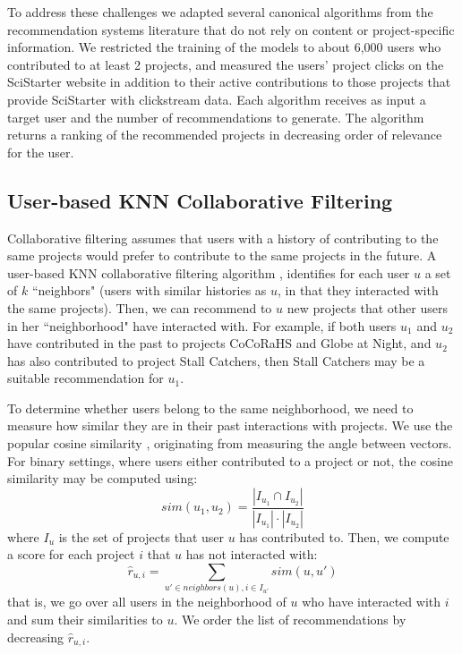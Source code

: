 \documentclass[letterpaper]{article} %
\begin{document}
 To address these challenges we adapted several canonical algorithms from the recommendation systems literature that do not
 rely on content or project-specific information. We restricted the training of the models to about 6,000 users
 who contributed to at least 2 projects, and measured the users' project clicks on the SciStarter website in addition to their active contributions to those projects that provide SciStarter  with clickstream data.
Each algorithm receives as input a target user and the number of recommendations to generate.
The algorithm returns a ranking of  the   recommended projects in decreasing order of relevance for the user.

\subsection{User-based KNN Collaborative Filtering}

Collaborative filtering assumes that users with a history of contributing to the same projects would prefer to contribute to the same projects in the future. A user-based KNN collaborative filtering  algorithm \cite{ning2015comprehensive},   identifies for each user $u$ a set of $k$ ``neighbors" (users with similar histories as $u$, in that they  interacted with the same projects). Then, we can recommend to $u$ new projects  that other users in her ``neighborhood" have interacted with.
For example, if both users $u_1$ and $u_2$ have contributed in the past to projects CoCoRaHS and Globe at Night, and $u_2$ has also contributed to project Stall Catchers, then Stall Catchers may be a suitable recommendation for $u_1$.

To determine whether users belong to the same neighborhood, we need to measure how similar they are in their past interactions with projects. We use the popular cosine similarity \cite{Breese98empiricalanalysis}, originating from measuring the angle between vectors. For binary settings, where users either contributed to a project or not, the cosine similarity may be computed using:
\begin{equation}
    sim(u_1,u_2) = \frac{|I_{u_1} \cap I_{u_2}|}{|I_{u_1}|\cdot|I_{u_2}|}
\end{equation}
where $I_u$ is the set of projects that user $u$ has contributed to.
Then, we compute a score for each project $i$ that $u$ has not interacted with:
\begin{equation}
    \hat{r}_{u,i} = \sum_{u' \in neighbors(u), i \in I_{u'}} sim(u,u')
\end{equation}
that is, we go over all users in the neighborhood of $u$ who have interacted with $i$ and sum their similarities to $u$. We order the list of recommendations by decreasing $\hat{r}_{u,i}$.
\end{document}
